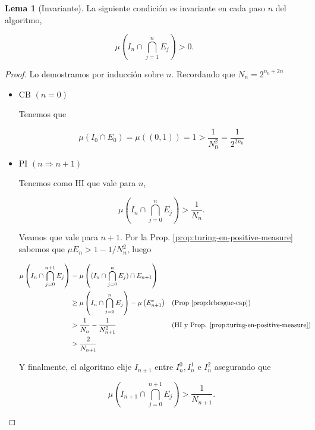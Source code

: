 \documentclass{article}
\theoremstyle{definition} %
\newtheorem*{lemma*}{Lema}
\newcommand{\measure}[1]{\mu\left(#1\right)}
\begin{document}
\begin{lemma*}[Invariante]
    La siguiente condición es invariante en cada paso $n$ del algoritmo,

    \[
        \measure{ 
            I_n \cap \bigcap_{j=1}^n E_j
        } > 0.
    \]
\end{lemma*}
\begin{proof}
    Lo demostramos por inducción sobre $n$. Recordando que $N_n = 2^{n_0 + 2n}$
    \begin{itemize}
        \item CB $(n = 0)$
        
        Tenemos que
        
        \[
            \measure{I_0 \cap E_0} 
            = \measure{(0, 1)} 
            = 1 
            > \frac{1}{N_0^2}
            = \frac{1}{2^{2n_0}}
        \]

        \item PI $(n \Rightarrow n + 1)$
        
        Tenemos como HI que vale para $n$,

        \[
            \measure{I_n \cap \bigcap_{j = 0}^n E_j} > \frac{1}{N_n}.
        \]

        Veamos que vale para $n+1$. Por la Prop.
        \ref{prop:turing-en-positive-measure} sabemos que $\mu E_n > 1 -
        1/N^2_n$, luego

        \begin{align*}
            \measure{I_n \cap \bigcap_{j = 0}^{n + 1} E_j}
            &= \measure{ (I_n \cap \bigcap_{j = 0}^{n} E_j) \cap E_{n + 1}} \\
            &\geq \measure{I_n \cap \bigcap_{j = 0}^{n} E_j} - \measure{E_{n + 1}^c}
            && \text{(Prop \ref{prop:lebesgue-cap}}) \\
            &> \frac{1}{N_n} - \frac{1}{N^2_{n+1}}
            &&\text{(HI y Prop. \ref{prop:turing-en-positive-measure})} \\
            &> \frac{2}{N_{n+1}}
        \end{align*}

        Y finalmente, el algoritmo elije $I_{n+1}$ entre $I_n^0, I_n^1$ e
        $I_n^2$ asegurando que
        
        \[
            \measure{I_{n+1} \cap \bigcap_{j = 0}^{n + 1} E_j} 
                > \frac{1}{N_{n+1}}.
        \]

    \end{itemize}
\end{proof}
\end{document}
